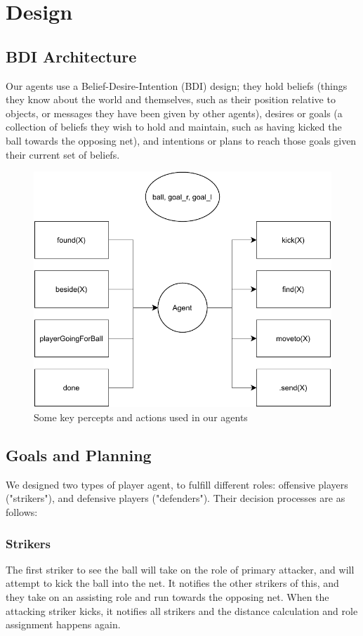 \documentclass[conference]{IEEEtran}
\begin{document}
\section{Design}

\subsection{BDI Architecture}
Our agents use a Belief-Desire-Intention (BDI) design; they hold beliefs (things they know about the world and themselves, such as their position relative to objects, or messages they have been given by other agents), desires or goals (a collection of beliefs they wish to hold and maintain, such as having kicked the ball towards the opposing net), and intentions or plans to reach those goals given their current set of beliefs. 
\begin{figure}[h]
	\centering
	\includegraphics[scale=0.5]{fig/percepts-and-actions.pdf}
	\caption{Some key percepts and actions used in our agents}
	\label{percepts-actions}
\end{figure}


\subsection{Goals and Planning}

We designed two types of player agent, to fulfill different roles: offensive players ("strikers"), and defensive players ("defenders"). Their decision processes are as follows:
\subsubsection{Strikers}
The first striker to see the ball will take on the role of primary attacker, and will attempt to kick the ball into the net. It notifies the other strikers of this, and they take on an assisting role and run towards the opposing net. When the attacking striker kicks, it notifies all strikers and the distance calculation and role assignment happens again.
\end{document}
